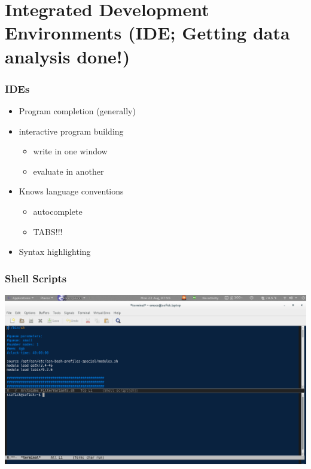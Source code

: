 \documentclass[t,10pt]{beamer}
\begin{document}
\section{Integrated Development Environments (IDE; Getting data analysis done!)}
\label{sec-3}
\begin{frame}
\frametitle{IDEs}
\label{sec-3-1}

\begin{itemize}
\item Program completion (generally)
\end{itemize}
\vspace{0.25in}
\begin{itemize}
\item interactive program building
\begin{itemize}
\item write in one window
\item evaluate in another
\end{itemize}
\end{itemize}
\vspace{0.25in}
\begin{itemize}
\item Knows language conventions
\begin{itemize}
\item autocomplete
\item TABS!!!
\end{itemize}
\end{itemize}
\vspace{0.25in}
\begin{itemize}
\item Syntax highlighting
\end{itemize}
\end{frame}
\begin{frame}
\frametitle{Shell Scripts}
\label{sec-3-2}

\includegraphics[width=.9\linewidth]{./sh_IDE.png}
\end{frame}
\end{document}
